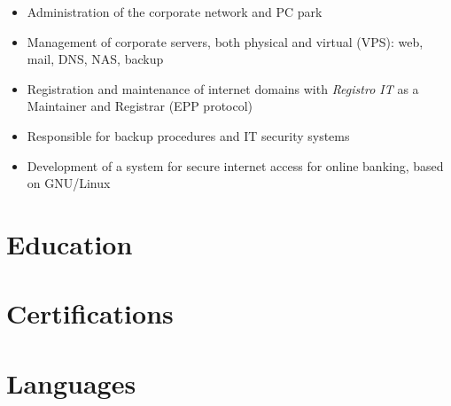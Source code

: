 \vspace{3mm}
        {\begin{itemize}
          \item Administration of the corporate network and PC park
          \item Management of corporate servers, both physical and virtual (VPS): web, mail, DNS, NAS, backup
          \item Registration and maintenance of internet domains with \emph{Registro IT} as a Maintainer and Registrar (EPP protocol)
          \item Responsible for backup procedures and IT security systems
          \item Development of a system for secure internet access for online banking, based on GNU/Linux
        \end{itemize}}
\section{Education}
\section{Certifications}
\section{Languages}
\vspace{3mm}
\closesection
\pagebreak
